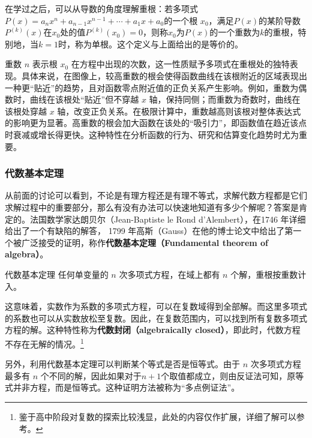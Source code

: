 在学过之后，可以从导数的角度理解重根：若多项式 $P(x) = a_n x^n + a_{n-1} x^{n-1} + \cdots + a_1 x + a_0$的一个根 $x_0$，满足$P(x)$的某阶导数$P^{(k)}(x)$在$x_0$处的值$P^{(k)}(x_0)=0$，则称$x_0$为$P(x)$的一个重数为$k$的重根，特别地，当$k=1$时，称为单根。这个定义与上面给出的是等价的。

重数 $n$ 表示根 $x_0$ 在方程中出现的次数，这一性质赋予多项式在重根处的独特表现。具体来说，在图像上，较高重数的根会使得函数曲线在该根附近的区域表现出一种更“贴近”的趋势，且对函数零点附近值的正负关系产生影响。例如，重数为偶数时，曲线在该根处“贴近”但不穿越 $x$ 轴，保持同侧；而重数为奇数时，曲线在该根处穿越 $x$ 轴，改变正负关系。在极限计算中，重数越高则该根对整体表达式的影响更为显著。高重数的根会加大函数在该处的“吸引力”，即函数值在趋近该点时衰减或增长得更快。这种特性在分析函数的行为、研究和估算变化趋势时尤为重要。

\subsubsection{代数基本定理}

从前面的讨论可以看到，不论是有理方程还是有理不等式，求解代数方程都是它们求解过程中的重要部分，那么有没有办法可以快速地知道有多少个解呢？答案是肯定的。法国数学家达朗贝尔（Jean-Baptiste le Rond d'Alembert），在1746 年详细给出了一个有缺陷的解答， 1799 年高斯（Gauss）在他的博士论文中给出了第一个被广泛接受的证明，称作\textbf{代数基本定理（Fundamental theorem of algebra）}。

\begin{theorem}{代数基本定理}\label{the_HsEquN_1}
任何单变量的 $n$ 次多项式方程，在域上都有 $n$ 个解，重根按重数计入。
\end{theorem}

这意味着，实数作为系数的多项式方程，可以在复数域得到全部解。而这里多项式的系数也可以从实数放松至复数。因此，在复数范围内，可以找到所有复数多项式方程的解。这种特性称为\textbf{代数封闭（algebraically closed）}，即此时，代数方程不存在无解的情况。\footnote{鉴于高中阶段对复数的探索比较浅显，此处的内容仅作扩展，详细了解可以参考。}

另外，利用代数基本定理可以判断某个等式是否是恒等式。由于 $n$ 次多项式方程最多有 $n$ 个不同的解，因此如果对于$n+1$个取值都成立，则由反证法可知，原等式并非方程，而是恒等式。这种证明方法被称为“多点例证法”。